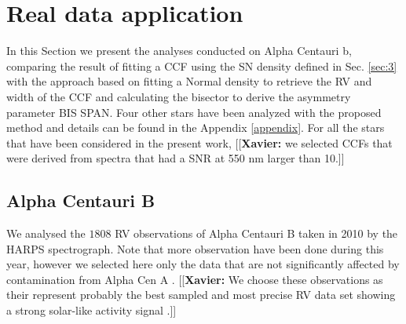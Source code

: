 \documentclass[11pt, oneside]{article}
\newcommand{\xavier}[1]{{\color{blue}[[\textbf{Xavier: }#1]]}}
\begin{document}
\section{Real data application} \label{sec:4}

In this Section we present the analyses conducted on Alpha Centauri b, comparing the result of fitting a CCF using the SN density defined in Sec. \ref{sec:3} with the approach based on fitting a Normal density to retrieve the RV and width of the CCF and calculating the bisector to derive the asymmetry parameter BIS SPAN. Four other stars have been analyzed with the proposed method and details can be found in the Appendix \ref{appendix}. For all the stars that have been considered in the present work, \xavier{we selected CCFs  that were derived from spectra that had a SNR at 550 nm larger than 10.}


\subsection{Alpha Centauri B} \label{sec:alphacentb}

We analysed the $1808$ RV observations of Alpha Centauri B taken in 2010 by the HARPS spectrograph. Note that more observation have been done during this year, however we selected here only the data that are not significantly affected by contamination from Alpha Cen A \citep[see][]{Dumusque-2012}. \xavier{We choose these observations as their represent probably the best sampled and most precise RV data set showing a strong solar-like activity signal \citep{Thompson-2017, Dumusque-2012}.}
\end{document}
